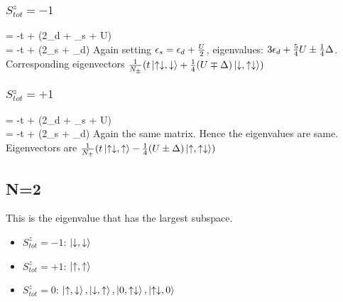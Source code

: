 \documentclass[12pt]{article}
\begin{document}
\subsubsection{\(S_{tot}^z = -1\)}
\beq
\ham \ket{\uparrow\downarrow,\downarrow} = -t\ket{\downarrow,\uparrow\downarrow} + (2\epsilon_d + \epsilon_s + U)\ket{\uparrow\downarrow,\downarrow} \\
\ham \ket{\downarrow,\uparrow\downarrow} = -t\ket{\uparrow\downarrow,\downarrow} + (2\epsilon_s + \epsilon_d)\ket{\downarrow,\uparrow\downarrow}
\eeq
\beq
{}
\eeq
Again setting \(\epsilon_s = \epsilon_d + \frac{U}{2}\), eigenvalues: \(3\epsilon_d + \frac{5}{4}U \pm \frac{1}{4}\Delta\). \\ Corresponding eigenvectors \(\frac{1}{N_\pm}(t\ket{\uparrow\downarrow,\downarrow}+\frac{1}{4}(U\mp\Delta)\ket{\downarrow,\uparrow\downarrow})\)

\subsubsection{\(S_{tot}^z = +1\)}
\beq
\ham \ket{\uparrow\downarrow,\uparrow} = -t\ket{\uparrow,\uparrow\downarrow} + (2\epsilon_d + \epsilon_s + U)\ket{\uparrow\downarrow,\uparrow} \\
\ham \ket{\uparrow,\uparrow\downarrow} = -t\ket{\uparrow\downarrow,\uparrow} + (2\epsilon_s + \epsilon_d)\ket{\uparrow,\uparrow\downarrow}
\eeq
Again the same matrix. Hence the eigenvalues are same. Eigenvectors are
\(\frac{1}{N_\pm}(t\ket{\uparrow\downarrow,\uparrow}-\frac{1}{4}(U\pm\Delta)\ket{\uparrow,\uparrow\downarrow})\)

\subsection{N=2}
This is the eigenvalue that has the largest subspace.
\begin{itemize}
\item \(S_{tot}^z = -1\): \(\ket{\downarrow,\downarrow}\)
\item \(S_{tot}^z = +1\): \(\ket{\uparrow,\uparrow}\)
\item \(S_{tot}^z = 0\):  \(\ket{\uparrow,\downarrow},\ket{\downarrow,\uparrow},\ket{0,\uparrow\downarrow},\ket{\uparrow\downarrow,0}\)
\end{itemize}
\end{document}
